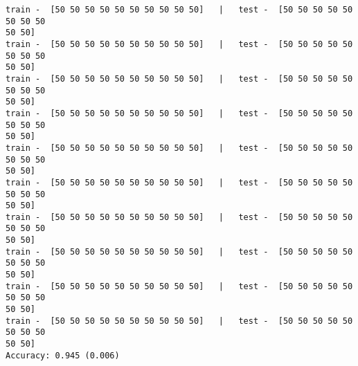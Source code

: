\documentclass[11pt]{article}
\begin{document}
    \begin{Verbatim}[commandchars=\\\{\}]
train -  [50 50 50 50 50 50 50 50 50 50]   |   test -  [50 50 50 50 50 50 50 50
50 50]
train -  [50 50 50 50 50 50 50 50 50 50]   |   test -  [50 50 50 50 50 50 50 50
50 50]
train -  [50 50 50 50 50 50 50 50 50 50]   |   test -  [50 50 50 50 50 50 50 50
50 50]
train -  [50 50 50 50 50 50 50 50 50 50]   |   test -  [50 50 50 50 50 50 50 50
50 50]
train -  [50 50 50 50 50 50 50 50 50 50]   |   test -  [50 50 50 50 50 50 50 50
50 50]
train -  [50 50 50 50 50 50 50 50 50 50]   |   test -  [50 50 50 50 50 50 50 50
50 50]
train -  [50 50 50 50 50 50 50 50 50 50]   |   test -  [50 50 50 50 50 50 50 50
50 50]
train -  [50 50 50 50 50 50 50 50 50 50]   |   test -  [50 50 50 50 50 50 50 50
50 50]
train -  [50 50 50 50 50 50 50 50 50 50]   |   test -  [50 50 50 50 50 50 50 50
50 50]
train -  [50 50 50 50 50 50 50 50 50 50]   |   test -  [50 50 50 50 50 50 50 50
50 50]
Accuracy: 0.945 (0.006)
\end{Verbatim}
\end{document}
